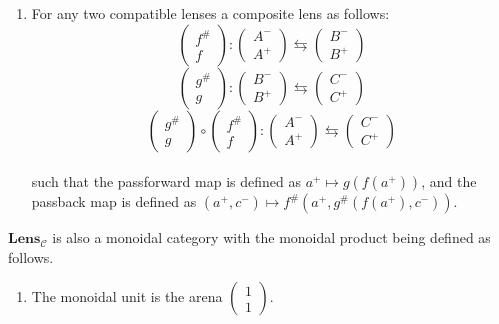 \documentclass[12pt]{article}
\begin{document}
\begin{definition*}{}{}
    \begin{enumerate}\addtocounter{enumi}{3}
        \item For any two compatible lenses a composite lens as follows:
              $$\begin{pmatrix}f^{\#}\\f\end{pmatrix}:\begin{pmatrix}A^-\\A^+\end{pmatrix}\leftrightarrows\begin{pmatrix}B^-\\B^+\end{pmatrix}$$
              $$\begin{pmatrix}g^{\#}\\g\end{pmatrix}:\begin{pmatrix}B^-\\B^+\end{pmatrix}\leftrightarrows\begin{pmatrix}C^-\\C^+\end{pmatrix}$$
              $$\begin{pmatrix}g^{\#}\\g\end{pmatrix} \circ \begin{pmatrix}f^{\#}\\f\end{pmatrix}:\begin{pmatrix}A^-\\A^+\end{pmatrix}\leftrightarrows\begin{pmatrix}C^-\\C^+\end{pmatrix}$$
              \\such that the passforward map is defined as $a^+ \mapsto g(f(a^+))$,
              and the passback map is defined as $(a^+, c^-) \mapsto f^\#(a^+, g^\#(f(a^+), c^-))$.
    \end{enumerate}
    $\textbf{Lens}_{\mathcal{C}}$ is also a monoidal category with the monoidal product being defined as follows.
    \begin{enumerate}
        \item The monoidal unit is the arena $\begin{pmatrix}1\\1\end{pmatrix}$.

\end{enumerate}
\end{definition*}
\end{document}
